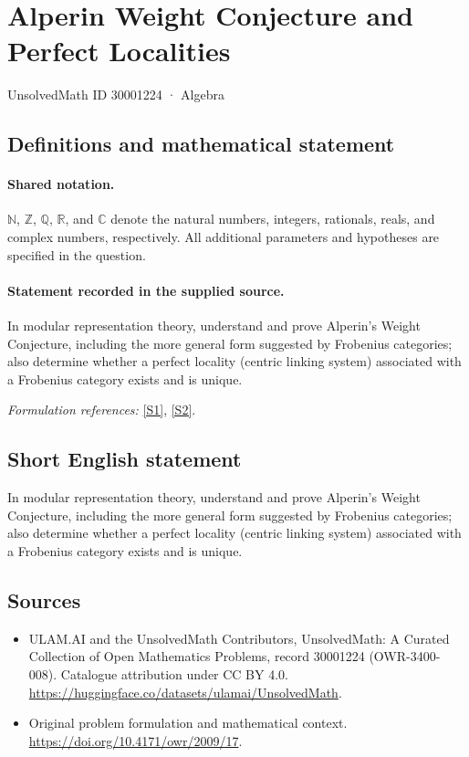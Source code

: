 \documentclass[11pt]{article}
\newcommand{\sref}[2]{\hyperlink{source:#1:#2}{[S#2]}}
\begin{document}
\setcounter{section}{30001223}
\section{Alperin Weight Conjecture and Perfect Localities}\label{30001224}
{\small UnsolvedMath ID 30001224 · Algebra}
\subsection{Definitions and mathematical statement}

\paragraph{Shared notation.}$\mathbb N$, $\mathbb Z$, $\mathbb Q$, $\mathbb R$, and $\mathbb C$ denote the natural numbers, integers, rationals, reals, and complex numbers, respectively. All additional parameters and hypotheses are specified in the question.


\paragraph{Statement recorded in the supplied source.}
In modular representation theory, understand and prove Alperin's Weight Conjecture, including the more general form suggested by Frobenius categories; also determine whether a perfect locality (centric linking system) associated with a Frobenius category exists and is unique.
\par\smallskip\textit{Formulation references:} \sref{30001224}{1}, \sref{30001224}{2}.
\subsection{Short English statement}
In modular representation theory, understand and prove Alperin's Weight Conjecture, including the more general form suggested by Frobenius categories; also determine whether a perfect locality (centric linking system) associated with a Frobenius category exists and is unique.
\subsection{Sources}
\begin{itemize}
\item[\hypertarget{source:30001224:1}{S1}] ULAM.AI and the UnsolvedMath Contributors, UnsolvedMath: A Curated Collection of Open Mathematics Problems, record 30001224 (OWR-3400-008). Catalogue attribution under CC BY 4.0.
\url{https://huggingface.co/datasets/ulamai/UnsolvedMath}.
\item[\hypertarget{source:30001224:2}{S2}] Original problem formulation and mathematical context.
\url{https://doi.org/10.4171/owr/2009/17}.
\end{itemize}
\label{end:30001224}
\end{document}

